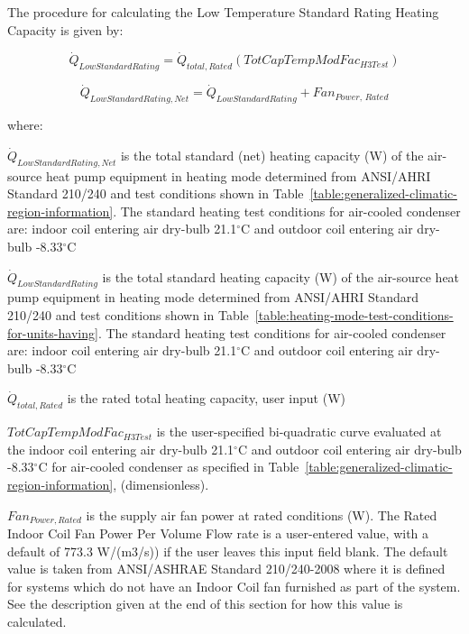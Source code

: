 The procedure for calculating the Low Temperature Standard Rating Heating Capacity is given by:

\begin{equation}
{\dot Q_{LowStandardRating}} = {\dot Q_{total,Rated}}\left( {TotCapTempModFa{c_{H3Test}}} \right)
\end{equation}

\begin{equation}
{\dot Q_{LowStandardRating,Net}} = {\dot Q_{LowStandardRating}} + Fa{n_{Power,\,Rated}}
\end{equation}

where:

\({\dot Q_{LowStandardRating,Net}}\) is the total standard (net) heating capacity (W) of the air-source heat pump equipment in heating mode determined from ANSI/AHRI Standard 210/240 and test conditions shown in Table~\ref{table:generalized-climatic-region-information}. The standard heating test conditions for air-cooled condenser are: indoor coil entering air dry-bulb 21.1\(^{\circ}\)C and outdoor coil entering air dry-bulb -8.33\(^{\circ}\)C

\({\dot Q_{LowStandardRating}}\) is the total standard heating capacity (W) of the air-source heat pump equipment in heating mode determined from ANSI/AHRI Standard 210/240 and test conditions shown in Table~\ref{table:heating-mode-test-conditions-for-units-having}. The standard heating test conditions for air-cooled condenser are: indoor coil entering air dry-bulb 21.1\(^{\circ}\)C and outdoor coil entering air dry-bulb -8.33\(^{\circ}\)C

\({\dot Q_{total,Rated}}\) is the rated total heating capacity, user input (W)

\(TotCapTempModFa{c_{H3Test}}\) is the user-specified bi-quadratic curve evaluated at the indoor coil entering air dry-bulb 21.1\(^{\circ}\)C and outdoor coil entering air dry-bulb -8.33\(^{\circ}\)C for air-cooled condenser as specified in Table~\ref{table:generalized-climatic-region-information}, (dimensionless).

\(Fa{n_{Power,Rated}}\) is the supply air fan power at rated conditions (W). The Rated Indoor Coil Fan Power Per Volume Flow rate is a user-entered value, with a default of 773.3 W/(m3/s)) if the user leaves this input field blank. The default value is taken from ANSI/ASHRAE Standard 210/240-2008 where it is defined for systems which do not have an Indoor Coil fan furnished as part of the system. See the description given at the end of this section for how this value is calculated.

